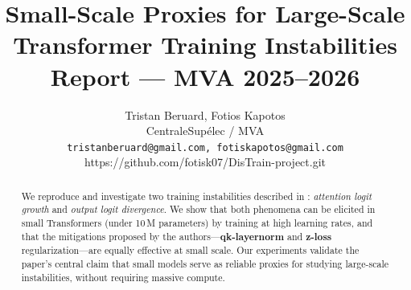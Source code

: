 \documentclass{article}
\title{%
  Small-Scale Proxies for Large-Scale\\
  Transformer Training Instabilities\\[0.3em]
  \large Report --- MVA 2025--2026
}
\author{
  Tristan Beruard, Fotios Kapotos\\
  CentraleSupélec / MVA\\
  \texttt{tristanberuard@gmail.com, fotiskapotos@gmail.com}\\
  https://github.com/fotisk07/DisTrain-project.git
}
\begin{document}
\maketitle

\begin{abstract}
We reproduce and investigate two training instabilities described in
\citet{wortsman2023smallscale}: \emph{attention logit growth} and
\emph{output logit divergence}.
We show that both phenomena can be elicited in small Transformers
(under 10\,M parameters) by training at high learning rates, and that the
mitigations proposed by the authors---\textbf{qk-layernorm} and
\textbf{z-loss} regularization---are equally effective at small scale.
Our experiments validate the paper's central claim that small models serve as
reliable proxies for studying large-scale instabilities, without requiring
massive compute.
\end{abstract}






% 
% 



\end{document}
